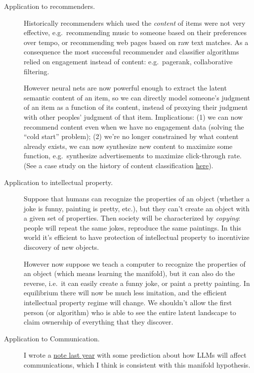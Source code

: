 \documentclass[
  10pt,
  letterpaper,
  DIV=11,
  numbers=noendperiod,
  oneside]{scrartcl}
\begin{document}
\begin{description}
\item[Application to recommenders.]
Historically recommenders which used the \emph{content} of items were
not very effective, e.g.~recommending music to someone based on their
preferences over tempo, or recommending web pages based on raw text
matches. As a consequence the most successful recommender and classifier
algorithms relied on engagement instead of content: e.g.~pagerank,
collaborative filtering.

However neural nets are now powerful enough to extract the latent
semantic content of an item, so we can directly model someone's judgment
of an item as a function of its content, instead of proxying their
judgment with other peoples' judgment of that item. Implications: (1) we
can now recommend content even when we have no engagement data (solving
the ``cold start'' problem); (2) we're no longer constrained by what
content already exists, we can now synthesize new content to maximize
some function, e.g.~synthesize advertisements to maximize click-through
rate. (See a case study on the history of content classification
\href{https://tecunningham.github.io/posts/2023-11-18-history-automated-text-moderation.html}{here}).
\item[Application to intellectual property.]
Suppose that humans can recognize the properties of an object (whether a
joke is funny, painting is pretty, etc.), but they can't create an
object with a given set of properties. Then society will be
characterized by \emph{copying}: people will repeat the same jokes,
reproduce the same paintings. In this world it's efficient to have
protection of intellectual property to incentivize discovery of new
objects.

However now suppose we teach a computer to recognize the properties of
an object (which means learning the manifold), but it can also do the
reverse, i.e.~it can easily create a funny joke, or paint a pretty
painting. In equilibrium there will now be much less imitation, and the
efficient intellectual property regime will change. We shouldn't allow
the first person (or algorithm) who is able to see the entire latent
landscape to claim ownership of everything that they discover.
\item[Application to Communication.]
I wrote a
\href{https://tecunningham.github.io/posts/2023-06-06-effect-of-ai-on-communication.html}{note
last year} with some prediction about how LLMs will affect
communications, which I think is consistent with this manifold
hypothesis.


\end{description}
\end{document}
